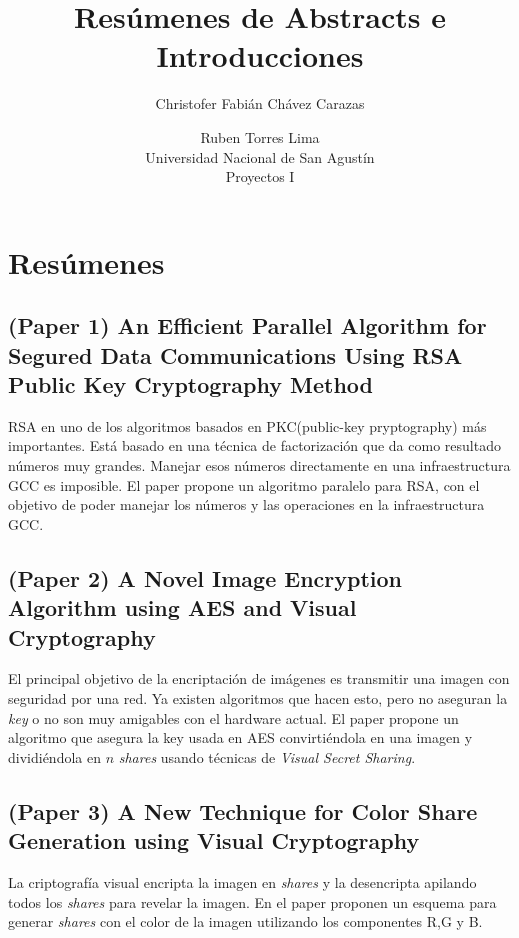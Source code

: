 \documentclass[a4paper,12pt]{article}
\begin{document}
\title{Resúmenes de Abstracts e Introducciones}
\author{
Christofer Fabián Chávez Carazas \and Ruben Torres Lima \\
\small{Universidad Nacional de San Agustín} \\
\small{Proyectos I}
}

\maketitle

\section{Resúmenes}

\subsection{(Paper 1) An Efficient Parallel Algorithm for Segured Data Communications Using RSA Public Key Cryptography Method}

RSA en uno de los algoritmos basados en PKC(public-key pryptography) más importantes. Está basado en una técnica de
factorización que da como resultado números muy grandes. Manejar esos números directamente en una infraestructura GCC es imposible.
El paper propone un algoritmo paralelo para RSA, con el objetivo de poder manejar los números y las operaciones en
la infraestructura GCC.

\subsection{(Paper 2) A Novel Image Encryption Algorithm using AES and Visual Cryptography}

El principal objetivo de la encriptación de imágenes es transmitir una imagen con seguridad por una red. Ya existen
algoritmos que hacen esto, pero no aseguran la \textit{key} o no son muy amigables con el hardware 
actual. El paper propone un algoritmo que asegura la key usada en AES convirtiéndola en una imagen y dividiéndola en
$n$ \textit{shares} usando técnicas de \textit{Visual Secret Sharing}.

\subsection{(Paper 3) A New Technique for Color Share Generation using Visual Cryptography}

La criptografía visual encripta la imagen en \textit{shares} y la desencripta apilando todos los \textit{shares} para revelar
la imagen. En el paper proponen un esquema para generar \textit{shares} con el color de la imagen utilizando los
componentes R,G y B.
\end{document}
